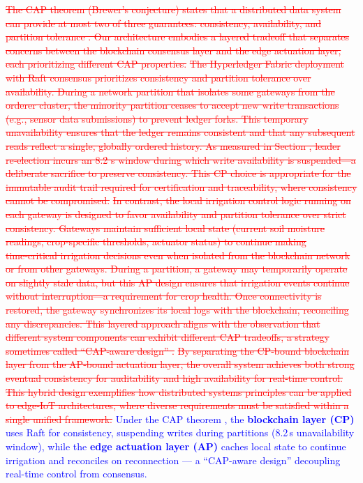 \documentclass[pdflatex,sn-mathphys-num]{sn-jnl}
\theoremstyle{thmstyleone}
\theoremstyle{thmstyletwo}
\theoremstyle{thmstylethree}
\begin{document}
{\textcolor{red}{\sout{The CAP theorem (Brewer's conjecture) states that a distributed data system can provide at most two of three guarantees: consistency, availability, and partition tolerance . Our architecture embodies a layered tradeoff that separates concerns between the blockchain consensus layer and the edge actuation layer, each prioritizing different CAP properties.}}
\textcolor{red}{\sout{The Hyperledger Fabric deployment with Raft consensus prioritizes consistency and partition tolerance over availability. During a network partition that isolates some gateways from the orderer cluster, the minority partition ceases to accept new write transactions (e.g., sensor data submissions) to prevent ledger forks. This temporary unavailability ensures that the ledger remains consistent and that any subsequent reads reflect a single, globally ordered history. As measured in Section , leader re‑election incurs an 8.2 s window during which write availability is suspended—a deliberate sacrifice to preserve consistency. This CP choice is appropriate for the immutable audit trail required for certification and traceability, where consistency cannot be compromised.}}
\textcolor{red}{\sout{In contrast, the local irrigation control logic running on each gateway is designed to favor availability and partition tolerance over strict consistency. Gateways maintain sufficient local state (current soil moisture readings, crop‑specific thresholds, actuator status) to continue making time‑critical irrigation decisions even when isolated from the blockchain network or from other gateways. During a partition, a gateway may temporarily operate on slightly stale data, but this AP design ensures that irrigation events continue without interruption—a requirement for crop health. Once connectivity is restored, the gateway synchronizes its local logs with the blockchain, reconciling any discrepancies. This layered approach aligns with the observation that different system components can exhibit different CAP tradeoffs, a strategy sometimes called “CAP‐aware design” .}}
\textcolor{red}{\sout{By separating the CP‑bound blockchain layer from the AP‑bound actuation layer, the overall system achieves both strong eventual consistency for auditability and high availability for real‑time control. This hybrid design exemplifies how distributed systems principles can be applied to edge‑IoT architectures, where diverse requirements must be satisfied within a single unified framework.}}
\textcolor{blue}{Under the CAP theorem \cite{brewer2000towards, gilbert2002brewer}, the \textbf{blockchain layer (CP)} uses Raft for consistency, suspending writes during partitions (8.2\,s unavailability window), while the \textbf{edge actuation layer (AP)} caches local state to continue irrigation and reconciles on reconnection — a “CAP-aware design” \cite{pritchett2008base} decoupling real-time control from consensus.}

}
\end{document}
